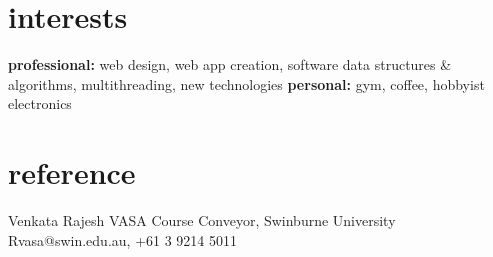 \documentclass[]{friggeri-cv} %
\begin{document}



\section{interests}

\textbf{professional:} web design, web app creation, software data structures \& algorithms, multithreading, new technologies \textbf{personal:} gym, coffee, hobbyist electronics


\section{reference}

\begin{entrylist}
\entry
{}
{Venkata Rajesh VASA}
{Course Conveyor, Swinburne University}
{Rvasa@swin.edu.au, +61 3 9214 5011}
\end{entrylist}
\end{document}

